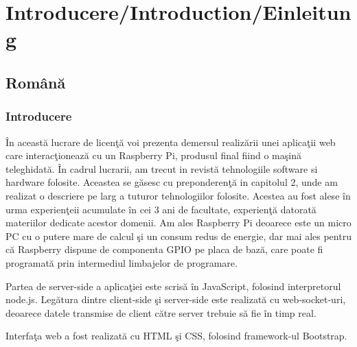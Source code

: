 
\chapter{Introducere/Introduction/Einleitung} %

\label{Chapter1} %


\section{Rom\^ an\u a}
\subsection{Introducere}


\^In aceast\u a lucrare de licen\c t\u a voi prezenta demersul realiz\u arii unei aplica\c tii web care interac\c tioneaz\u a cu un Raspberry Pi, produsul final fiind o ma\c sin\u a teleghidat\u a. \^ In cadrul lucrarii, am trecut in revist\u a tehnologiile software si hardware folosite. Aceastea se g\u asesc cu preponderen\c t\u a in capitolul 2, unde am realizat o descriere pe larg a tuturor tehnologiilor folosite. Acestea au fost alese \^ in urma experien\c teii acumulate \^ in cei 3 ani de facultate, experien\c t\u a datorat\u a materiilor dedicate acestor domenii. Am ales Raspberry Pi deoarece este un micro PC cu o putere mare de calcul \c si un consum redus de energie, dar mai ales pentru c\u a Raspberry dispune de componenta GPIO pe placa de baz\u a, care poate fi programat\u a prin intermediul  limbajelor de programare. 

Partea de server-side a aplica\c tiei este scris\u a \^ in JavaScript, folosind interpretorul node.js. Leg\u atura dintre client-side \c si server-side este realizat\u a cu web-socket-uri, deoarece datele transmise de client c\u atre server trebuie s\u a fie \^ in timp real.

Interfa\c ta web a fost realizat\u a cu HTML \c si CSS, folosind framework-ul Bootstrap.

